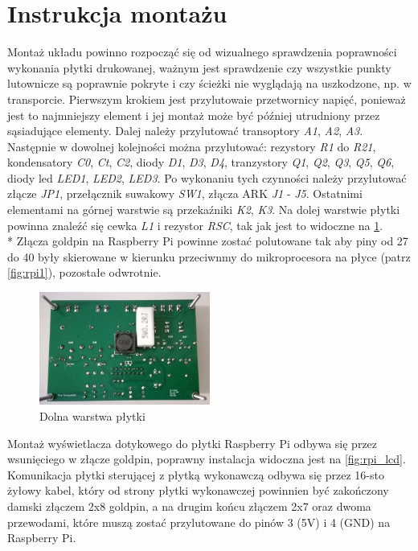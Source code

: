 \documentclass[12pt, eng, twoside, openany, final]{mgr}
\begin{document}
    \section{Instrukcja montażu}
    Montaż układu powinno rozpocząć się od wizualnego sprawdzenia poprawności wykonania płytki drukowanej, ważnym jest sprawdzenie czy wszystkie punkty lutownicze są poprawnie pokryte i czy ścieżki nie wyglądają na uszkodzone, np. w transporcie.
    Pierwszym krokiem jest przylutowaie przetwornicy napięć, ponieważ jest to najmniejszy element i jej montaż może być później utrudniony przez sąsiadujące elementy. Dalej należy przylutować transoptory \emph{A1}, \emph{A2}, \emph{A3}.  Następnie w dowolnej kolejności można przylutować: rezystory \emph{R1} do \emph{R21}, kondensatory \emph{C0}, \emph{Ct}, \emph{C2}, diody \emph{D1}, \emph{D3}, \emph{D4}, tranzystory \emph{Q1}, \emph{Q2}, \emph{Q3}, \emph{Q5}, \emph{Q6}, diody led \emph{LED1}, \emph{LED2}, \emph{LED3}. Po wykonaniu tych czynności należy przylutować złącze \emph{JP1}, przełącznik suwakowy \emph{SW1}, złącza ARK \emph{J1} - \emph{J5}. Ostatnimi elementami na górnej warstwie są przekaźniki \emph{K2}, \emph{K3}. Na dolej warstwie płytki powinna znaleźć się cewka \emph{L1} i rezystor \emph{RSC}, tak jak jest to widoczne na \ref{fig:pcb_dol}. \\*
    Złącza goldpin na Raspberry Pi powinne zostać polutowane tak aby piny od 27 do 40 były skierowane w kierunku przeciwnmy do mikroprocesora na płyce (patrz \ref{fig:rpi1}), pozostałe odwrotnie. 
            \begin{figure}[H]
            \begin{center}
                \includegraphics[width=0.5\textwidth]{dol.jpg}
                \caption{Dolna warstwa płytki} \label{fig:pcb_dol} 
            \end{center}
            \end{figure}
    Montaż wyświetlacza dotykowego do płytki Raspberry Pi odbywa się przez wsunięciego w złącze goldpin, poprawny instalacja widoczna jest na \ref{fig:rpi_lcd}. Komunikacja płytki sterującej z płytką wykonawczą odbywa się przez 16-sto żyłowy kabel, który od strony płytki wykonawczej powinnien być zakończony damski złączem 2x8 goldpin, a na drugim końcu złączem 2x7 oraz dwoma przewodami, które muszą zostać przylutowane do pinów 3 (5V) i 4 (GND) na Raspberry Pi. 
\end{document}
